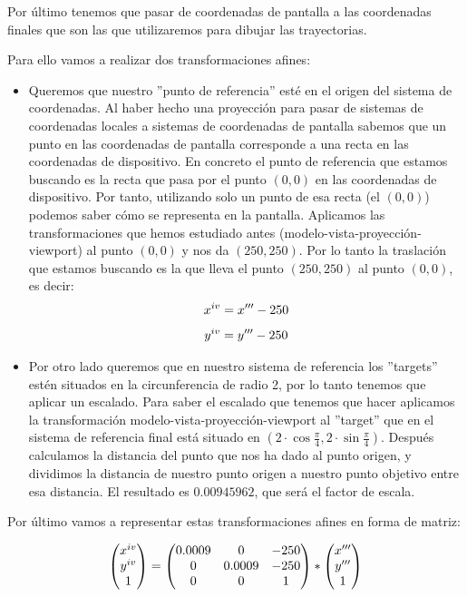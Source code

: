 \documentclass[a4paper,11pt, oneside]{book}
\begin{document}
Por último tenemos que pasar de coordenadas de pantalla a las coordenadas  finales que son las que utilizaremos para dibujar las trayectorias.

Para ello vamos a realizar dos transformaciones afines:
\begin{itemize}
	\item Queremos que nuestro ''punto de referencia'' esté en el origen del sistema de coordenadas. Al haber hecho una proyección para pasar de sistemas de coordenadas locales a sistemas de coordenadas de pantalla sabemos que un punto en las coordenadas de pantalla corresponde a una recta en las coordenadas de dispositivo. En concreto el punto de referencia que estamos buscando es la recta que pasa por el punto $(0,0)$ en las coordenadas de dispositivo. Por tanto, utilizando solo un punto de esa recta (el $(0,0)$) podemos saber cómo se representa en la pantalla. Aplicamos las transformaciones que hemos estudiado antes (modelo-vista-proyección-viewport) al punto $(0,0)$ y nos da $(250,250)$. Por lo tanto la traslación que estamos buscando es la que lleva el punto $(250,250)$ al punto $(0,0)$, es decir:
	\begin{equation}
	x^{\romannumeral 4} = x'''-250
	\end{equation}
	\begin{equation}
	y^{\romannumeral 4} = y'''-250
	\end{equation}
	\item Por otro lado queremos que en nuestro sistema de referencia los ''targets'' estén situados en la circunferencia de radio 2, por lo tanto tenemos que aplicar un escalado. Para saber el escalado que tenemos que hacer aplicamos la transformación modelo-vista-proyección-viewport al ''target'' que en el sistema de referencia final está situado en  $(2\cdot \cos\frac{\pi}{4},2\cdot \sin\frac{\pi}{4})$. Después calculamos la distancia del punto que nos ha dado al punto origen, y dividimos la distancia de nuestro punto origen a nuestro punto objetivo entre esa distancia. El resultado es $0.00945962$, que será el factor de escala.
\end{itemize}
Por último vamos a representar estas transformaciones afines en forma de matriz:

\begin{equation}
\begin{pmatrix}
x^{\romannumeral 4}\\
y^{\romannumeral 4}\\
1
\end{pmatrix} =
\begin{pmatrix}
0.0009 &0&-250\\
0&0.0009&-250\\
0&0&1 \\
\end{pmatrix}
*\begin{pmatrix}
x'''\\
y'''\\
1
\end{pmatrix}
\end{equation}
\end{document}
